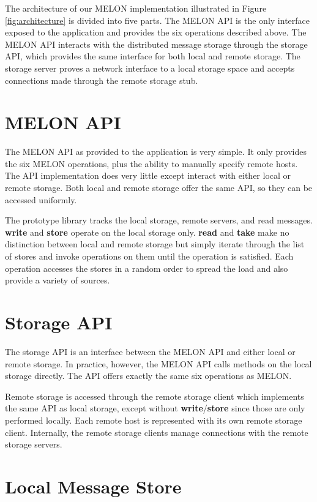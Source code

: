 The architecture of our MELON implementation illustrated in Figure \ref{fig:architecture} is divided into five parts. The MELON API is the only interface exposed to the application and provides the six operations described above. The MELON API interacts with the distributed message storage through the storage API, which provides the same interface for both local and remote storage. The storage server proves a network interface to a local storage space and accepts connections made through the remote storage stub.

\section{MELON API}

The MELON API as provided to the application is very simple. It only provides the six MELON operations, plus the ability to manually specify remote hosts. The API implementation does very little except interact with either local or remote storage. Both local and remote storage offer the same API, so they can be accessed uniformly.

The prototype library tracks the local storage, remote servers, and read messages. \textbf{write} and \textbf{store} operate on the local storage only. \textbf{read} and \textbf{take} make no distinction between local and remote storage but simply iterate through the list of stores and invoke operations on them until the operation is satisfied. Each operation accesses the stores in a random order to spread the load and also provide a variety of sources.

\section{Storage API}

The storage API is an interface between the MELON API and either local or remote storage. In practice, however, the MELON API calls methods on the local storage directly. The API offers exactly the same six operations as MELON.

Remote storage is accessed through the remote storage client which implements the same API as local storage, except without \textbf{write}/\textbf{store} since those are only performed locally. Each remote host is represented with its own remote storage client. Internally, the remote storage clients manage connections with the remote storage servers.

\section{Local Message Store}\label{impl:localstore}

